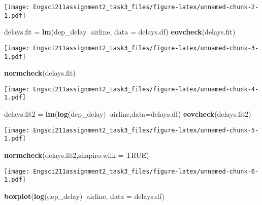 \documentclass[]{article}
\newenvironment{Shaded}{\begin{snugshade}}{\end{snugshade}}
\newcommand{\DataTypeTok}[1]{\textcolor[rgb]{0.13,0.29,0.53}{#1}}
\newcommand{\KeywordTok}[1]{\textcolor[rgb]{0.13,0.29,0.53}{\textbf{#1}}}
\newcommand{\NormalTok}[1]{#1}
\newcommand{\OperatorTok}[1]{\textcolor[rgb]{0.81,0.36,0.00}{\textbf{#1}}}
\newcommand{\OtherTok}[1]{\textcolor[rgb]{0.56,0.35,0.01}{#1}}
\newcommand{\StringTok}[1]{\textcolor[rgb]{0.31,0.60,0.02}{#1}}
\begin{document}
\texttt{[image: Engsci211assignment2\_task3\_files/figure-latex/unnamed-chunk-2-1.pdf]}

\begin{Shaded}
\begin{Highlighting}[]
\NormalTok{delays.fit =}\StringTok{ }\KeywordTok{lm}\NormalTok{(dep_delay}\OperatorTok{~}\NormalTok{airline, }\DataTypeTok{data =}\NormalTok{ delays.df)}
\KeywordTok{eovcheck}\NormalTok{(delays.fit)}
\end{Highlighting}
\end{Shaded}

\texttt{[image: Engsci211assignment2\_task3\_files/figure-latex/unnamed-chunk-3-1.pdf]}

\begin{Shaded}
\begin{Highlighting}[]
\KeywordTok{normcheck}\NormalTok{(delays.fit)}
\end{Highlighting}
\end{Shaded}

\texttt{[image: Engsci211assignment2\_task3\_files/figure-latex/unnamed-chunk-4-1.pdf]}

\begin{Shaded}
\begin{Highlighting}[]
\NormalTok{delays.fit2 =}\StringTok{ }\KeywordTok{lm}\NormalTok{(}\KeywordTok{log}\NormalTok{(dep_delay)}\OperatorTok{~}\NormalTok{airline,}\DataTypeTok{data=}\NormalTok{delays.df)}
\KeywordTok{eovcheck}\NormalTok{(delays.fit2)}
\end{Highlighting}
\end{Shaded}

\texttt{[image: Engsci211assignment2\_task3\_files/figure-latex/unnamed-chunk-5-1.pdf]}

\begin{Shaded}
\begin{Highlighting}[]
\KeywordTok{normcheck}\NormalTok{(delays.fit2,}\DataTypeTok{shapiro.wilk =} \OtherTok{TRUE}\NormalTok{)}
\end{Highlighting}
\end{Shaded}

\texttt{[image: Engsci211assignment2\_task3\_files/figure-latex/unnamed-chunk-6-1.pdf]}

\begin{Shaded}
\begin{Highlighting}[]
\KeywordTok{boxplot}\NormalTok{(}\KeywordTok{log}\NormalTok{(dep_delay)}\OperatorTok{~}\NormalTok{airline, }\DataTypeTok{data =}\NormalTok{ delays.df)}
\end{Highlighting}
\end{Shaded}
\end{document}
